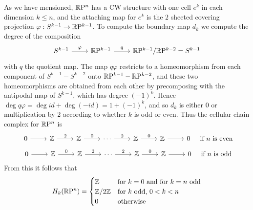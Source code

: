 \begin{example}
As we have mensioned, $\mathbb{R}\mathrm{P}^n$ has a CW structure with one cell $e^k$ in each dimension $k\leq n$, and the attaching map for $e^k$ is the $2$ sheeted covering projection $\varphi:S^{k-1}\to\mathbb{R}\mathrm{P}^{k-1}$. To compute the boundary map $d_k$ we compute the degree of the composition 
\[\begin{tikzcd}
S^{k-1}\ar[r,"\varphi"]&\RP^{k-1}\ar[r,"q"]&\RP^{k-1}/\RP^{k-2}=S^{k-1}
\end{tikzcd}\]
with $q$ the quotient map. The map $q\varphi$ restricts to a homeomorphism from each component of $S^{k-1}-S^{k-2}$ onto $\mathbb{R}\mathrm{P}^{k-1}-\mathbb{R}\mathrm{P}^{k-2}$, and these two homeomorphisms are obtained from each other by precomposing with the antipodal map of $S^{k-1}$, which has degree $(-1)^k$. Hence $\deg q\varphi=\deg id+\deg(-id)=1+(-1)^k$, and so $d_k$ is either $0$ or multiplication by $2$ according to whether $k$ is odd or even. Thus the cellular chain complex for $\mathbb{R}\mathrm{P}^n$ is
\[\begin{tikzcd}
0\ar[r]&\Z\ar[r,"2"]&\Z\ar[r,"0"]&\cdots\ar[r,"2"]&\Z\ar[r,"0"]&\Z\ar[r]&0
\end{tikzcd}\quad\text{if $n$ is even}\]
\[\begin{tikzcd}
0\ar[r]&\Z\ar[r,"0"]&\Z\ar[r,"2"]&\cdots\ar[r,"2"]&\Z\ar[r,"0"]&\Z\ar[r]&0
\end{tikzcd}\quad\text{if $n$ is odd}\]
From this it follows that
\[H_k(\mathbb{R}\mathrm{P}^n)=\begin{cases}
\mathbb{Z}&\text{for $k=0$ and for $k=n$ odd}\\
\mathbb{Z}/2\mathbb{Z}&\text{for $k$ odd, $0<k<n$}\\
0&\text{otherwise}
\end{cases}\]
\end{example}
